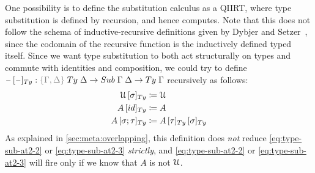 \documentclass[a4paper,UKenglish,numberwithinsect,cleveref,thm-restate]{lipics-v2021}
\begin{document}
One possibility is to define the substitution calculus as a QIIRT, where type substitution is defined by recursion, and hence computes.
Note that this does not follow the schema of inductive-recursive definitions given by Dybjer and Setzer~\cite{Dybjer1999}, since the codomain of the recursive function is the inductively defined typed itself.
Since we want type substitution to both act structurally on types and commute with identities and composition, we could try to define $\subTy{\blank}{\blank} : \implicit{\Gamma, \Delta} \; \Ty\;\Delta \to \Sub\;\Gamma\;\Delta \to \Ty\;\Gamma$ recursively as follows:
\begin{alignat}{3}
\subTy{\UU}{\sigma}         & \defid \UU                                   \label{eq:type-sub-at2-1} \\
\subTy{A}{\idS}             & \defid A                                     \label{eq:type-sub-at2-2} \\
\subTy{A}{\sigma ; \tau}    & \defid \subTy{\subTy{A}{\tau}}{\sigma} \label{eq:type-sub-at2-3}
\end{alignat}
As explained in \cref{sec:meta:overlapping}, this definition does \emph{not} reduce \eqref{eq:type-sub-at2-2} or \eqref{eq:type-sub-at2-3} \emph{strictly}, and \eqref{eq:type-sub-at2-2} or \eqref{eq:type-sub-at2-3} will fire only if we know that $A$ is not $\mathcal{U}$.
\end{document}

